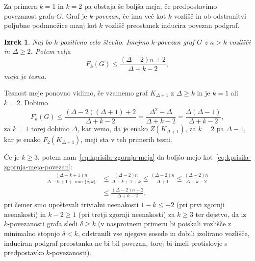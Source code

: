 \documentclass[12pt,a4paper,twoside]{article}
\theoremstyle{definition} %
\theoremstyle{plain} %
\newtheorem{izrek}[definicija]{Izrek}
\numberwithin{equation}{section}  %
\begin{document}
Za primera $k=1$ in $k=2$ pa obstaja še boljša meja, če predpostavimo povezanost grafa $G$. Graf je \emph{$k$-povezan}, če ima več kot $k$ vozlišč in ob odstranitvi poljubne podmnožice manj kot $k$ vozlišč preostanek inducira povezan podgraf.
\begin{izrek}{\cite[izrek 4.4]{amos2015kforcing}}
    Naj bo $k$ pozitivno celo število. Imejmo $k$-povezan graf $G$ z $n > k$ vozlišči in $\Delta \geq 2$. Potem velja
    \begin{equation}
        \label{eq:kprisila-zgornja-meja-povezan}
        F_k(G) \leq \frac{(\Delta - 2)n + 2}{\Delta + k -2},
    \end{equation}
    meja je tesna.
\end{izrek}
Tesnost meje ponovno vidimo, če vzamemo graf $K_{\Delta + 1}$ z $\Delta \geq k$ in je $k=1$ ali $k=2$. Dobimo
\[  F_k(G) \leq \frac{(\Delta - 2)(\Delta + 1) + 2}{\Delta + k -2} = \frac{\Delta^2 - \Delta}{\Delta + k -2} = \frac{\Delta(\Delta - 1)}{\Delta + k -2}, \]
za $k = 1$ torej dobimo $\Delta$, kar vemo, da je enako $Z(K_{\Delta + 1})$, za $k = 2$ pa $\Delta - 1$, kar je enako $F_2(K_{\Delta + 1})$, meji sta v teh primerih tesni.

Če je $k \geq 3$, potem nam~\eqref{eq:kprisila-zgornja-meja} da boljšo mejo kot~\eqref{eq:kprisila-zgornja-meja-povezan}:
\begin{align*}
\frac{(\Delta - k + 1)n}{\Delta - k + 1 + \min\{\delta,k\}} &\leq \frac{(\Delta - 2)n}{\Delta - k + 1 + k}
\leq \frac{(\Delta - 2)n}{\Delta + 1} \leq \frac{(\Delta - 2)n}{\Delta + k - 2} \\
&\leq \frac{(\Delta - 2)n + 2}{\Delta + k - 2},
\end{align*}
pri čemer smo upoštevali trivialni neenakosti $1 - k \leq -2$ (pri prvi zgornji neenakosti) in $k - 2 \geq 1$ (pri tretji zgornji neenakosti) za $k \geq 3$ ter dejstvo, da iz $k$-povezanosti grafa sledi $\delta \geq k$ (v nasprotnem primeru bi poiskali vozlišče z minimalno stopnjo $\delta < k$, odstranili vse njegove sosede in dobili izolirano vozlišče, induciran podgraf preostanka ne bi bil povezan, torej bi imeli protislovje s predpostavko $k$-povezanosti).
\end{document}
